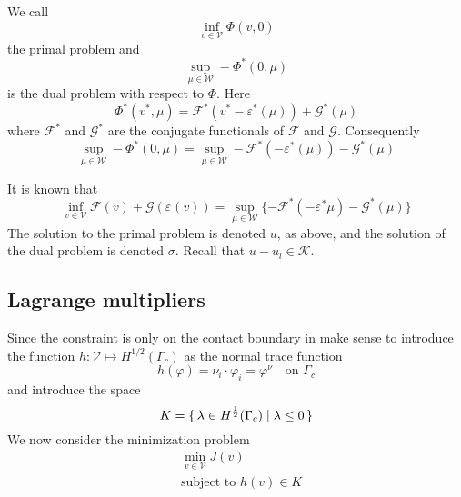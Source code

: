 \documentclass[12pt,a4paper]{article}
\numberwithin{equation}{section}
\numberwithin{table}{section}
\numberwithin{figure}{section}
\newcommand{\W}{\ensuremath{\mathcal{W}}}
\newcommand{\half}{\ensuremath{\frac{1}{2}}}
\newcommand{\V}{\ensuremath{\mathcal{V}}}
\newcommand{\K}{\ensuremath{\mathcal{K}}}
\newcommand{\F}{\ensuremath{{\mathcal F}}}
\newcommand{\G}{\ensuremath{{\mathcal G}}}
\renewcommand{\epsilon}{\varepsilon}
\renewcommand{\phi}{\varphi}
\newcommand{\strain}[1][]{\ensuremath{\epsilon_{#1}}}
\newcommand{\infvinV}{\ensuremath{\inf_{v\in \V}}}
\begin{document}
We call
\begin{equation}
  \infvinV \varPhi(v, 0)
\end{equation}
the primal problem and
\begin{equation}
  \sup_{\mu\in \W} -\varPhi^*(0,\mu)
\end{equation}
is the dual problem with respect to $\varPhi$.  Here
\begin{equation}
  \varPhi^*(v^*,\mu) = \F^*(v^*-\epsilon^*(\mu)) + \G^*(\mu)
\end{equation}
where $\F^*$ and $\G^*$ are the conjugate functionals of $\F$ and $\G$.  Consequently
\begin{equation}
  \sup_{\mu\in \W} -\varPhi^*(0,\mu)
  = \sup_{\mu\in \W} -\F^*(-\epsilon^*(\mu)) - \G^*(\mu)
\end{equation}

It is known that
\begin{equation}
  \label{eq:PrimalDualNoGap}
  \infvinV \F(v) + \G(\strain(v))
  = \sup_{\mu\in \W} \{ - \F^*(-\strain^* \mu) - \G^*(\mu) \}
\end{equation}
The solution to the primal problem is denoted $u$, as above, and the solution of the dual
problem is denoted $\sigma$.  Recall that $u-u_l\in \K$. 


\subsection{Lagrange multipliers}

Since the constraint is only on the contact boundary in make sense to introduce the function $h : \V \mapsto H^{1/2}(\Gamma_c)$ as the normal trace function
\begin{equation}
  h(\phi) = \nu_i\cdot\phi_i = \phi^\nu \quad \text{on $\Gamma_c$}
\end{equation}
and introduce the space
\begin{equation}
  K = \set{\lambda \in H^\half(\Gamma_c) | \lambda \le 0}
\end{equation}
We now consider the minimization problem 
\begin{equation}
  \begin{split}
    &\min_{v\in\V} J(v) \\
    &\text{subject to $h(v) \in K$}
  \end{split}
\end{equation}
\end{document}
